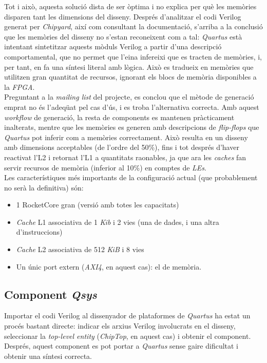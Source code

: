 \documentclass{article}
\begin{document}
Tot i això, aquesta solució dista de ser òptima i no explica per què les memòries disparen tant les dimensions del disseny.
Després d'analitzar el codi Verilog generat per \textit{Chipyard}, així com consultant la documentació, s'arriba a la conclusió que les memòries del disseny no s'estan reconeixent com a tal: \textit{Quartus} està intentant sintetitzar aquests mòduls Verilog a partir d'una descripció comportamental, que no permet que l'eina infereixi que es tracten de memòries, i, per tant, en fa una síntesi literal amb lògica.
Això es tradueix en memòries que utilitzen gran quantitat de recursos, ignorant els blocs de memòria disponibles a la \textit{FPGA}.
\\

Preguntant a la \textit{mailing list} del projecte, es conclou que el mètode de generació emprat no és l'adeqüat pel cas d'ús, i es troba l'alternativa correcta. Amb aquest \textit{workflow} de generació, la resta de components es mantenen pràcticament inalterats, mentre que les memòries es generen amb descripcions de \textit{flip-flops} que \textit{Quartus} pot inferir com a memòries correctament.
Això resulta en un disseny amb dimensions acceptables (de l'ordre del 50\%), fins i tot després d'haver reactivat l'L2 i retornat l'L1 a quantitats raonables, ja que ara les \textit{caches} fan servir recursos de memòria (inferior al 10\%) en comptes de \textit{LEs}.
\\

Les característiques més importants de la configuració actual (que probablement no serà la definitiva) són:
\begin{itemize}
\item 1 RocketCore gran (versió amb totes les capacitats)
\item \textit{Cache} L1 associativa de 1 \textit{Kib} i 2 vies (una de dades, i una altra d'instruccions)
\item \textit{Cache} L2 associativa de 512 \textit{KiB} i 8 vies
\item Un únic port extern (\textit{AXI4}, en aquest cas): el de memòria.
\end{itemize}

\subsection{Component \textit{Qsys}}

Importar el codi Verilog al dissenyador de plataformes de \textit{Quartus} ha estat un procés bastant directe: indicar els arxius Verilog involucrats en el disseny, seleccionar la \textit{top-level entity} (\textit{ChipTop}, en aquest cas) i obtenir el component. Després, aquest component es pot portar a \textit{Quartus} sense gaire dificultat i obtenir una síntesi correcta.
\\
\end{document}
